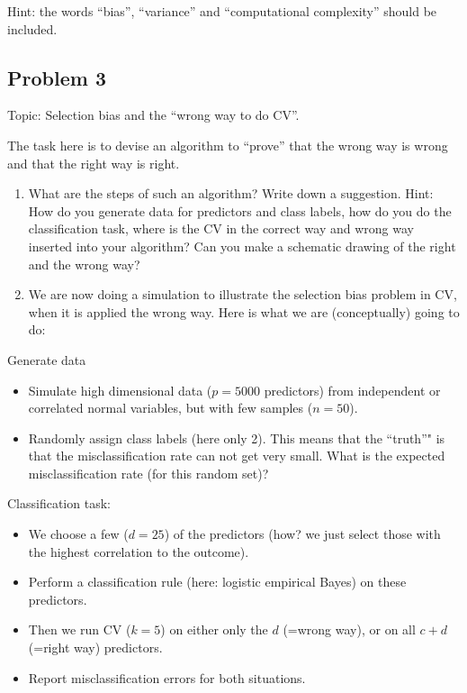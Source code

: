 \documentclass[]{article}
\providecommand{\tightlist}{%
  \setlength{\itemsep}{0pt}\setlength{\parskip}{0pt}}
\begin{document}
Hint: the words ``bias'', ``variance'' and ``computational complexity''
should be included.

\hypertarget{problem-3}{%
\subsection{Problem 3}\label{problem-3}}

Topic: Selection bias and the ``wrong way to do CV''.

The task here is to devise an algorithm to ``prove'' that the wrong way
is wrong and that the right way is right.

\begin{enumerate}
\def\labelenumi{\alph{enumi})}
\item
  What are the steps of such an algorithm? Write down a suggestion.
  Hint: How do you generate data for predictors and class labels, how do
  you do the classification task, where is the CV in the correct way and
  wrong way inserted into your algorithm? Can you make a schematic
  drawing of the right and the wrong way?
\item
  We are now doing a simulation to illustrate the selection bias problem
  in CV, when it is applied the wrong way. Here is what we are
  (conceptually) going to do:
\end{enumerate}

Generate data

\begin{itemize}
\item
  Simulate high dimensional data (\(p=5000\) predictors) from
  independent or correlated normal variables, but with few samples
  (\(n=50\)).
\item
  Randomly assign class labels (here only 2). This means that the
  ``truth''" is that the misclassification rate can not get very small.
  What is the expected misclassification rate (for this random set)?
\end{itemize}

Classification task:

\begin{itemize}
\tightlist
\item
  We choose a few (\(d=25\)) of the predictors (how? we just select
  those with the highest correlation to the outcome).
\item
  Perform a classification rule (here: logistic empirical Bayes) on
  these predictors.
\item
  Then we run CV (\(k=5\)) on either only the \(d\) (=wrong way), or on
  all \(c+d\) (=right way) predictors.
\item
  Report misclassification errors for both situations.
\end{itemize}
\end{document}
